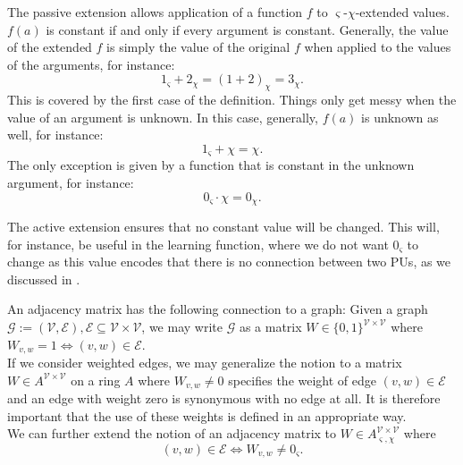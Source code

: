 \documentclass[a4paper,11pt]{report}
\newcommand{\const}{\varsigma} %
\newcommand{\var}{\chi} %
\begin{document}
\begin{Par}
The passive extension allows application of a function $f$ to $\const$-$\var$-extended values. $f(a)$ is constant if and only if every argument is constant. Generally, the value of the extended $f$ is simply the value of the original $f$ when applied to the values of the arguments, for instance:
\[
1_{\const}+2_{\var}=(1+2)_{\var}=3_{\var}.
\]
This is covered by the first case of the definition. Things only get messy when the value of an argument is unknown. In this case, generally, $f(a)$ is unknown as well, for instance:
\[
1_{\const}+\chi=\chi.
\]
The only exception is given by a function that is constant in the unknown argument, for instance:
\[
0_{\const}\cdot\chi =0_{\var}.
\]
\end{Par}

\begin{Par}
The active extension ensures that no constant value will be changed. This will, for instance, be useful in the learning function, where we do not want $0_{\const}$ to change as this value encodes that there is no connection between two PUs, as we discussed in .
\end{Par}

\begin{Par}\label{par:adjacency}
An adjacency matrix has the following connection to a graph: Given a graph $\mathcal{G}:=(\mathcal{V},\mathcal{E}),\mathcal{E}\subseteq\mathcal{V}\times\mathcal{V}$, we may write $\mathcal{G}$ as a matrix $W\in\{0,1\}^{\mathcal{V}\times\mathcal{V}}$ where $W_{v,w}=1\Leftrightarrow (v,w)\in\mathcal{E}$.\\
If we consider weighted edges, we may generalize the notion to a matrix $W\in A^{\mathcal{V}\times\mathcal{V}}$ on a ring $A$ where $W_{v,w}\ne 0$ specifies the weight of edge $(v,w)\in\mathcal{E}$ and an edge with weight zero is synonymous with no edge at all. It is therefore important that the use of these weights is defined in an appropriate way.\\
We can further extend the notion of an adjacency matrix to $W\in A^{\mathcal{V}\times\mathcal{V}}_{\const,\var}$ where
\begin{equation}\label{eq:matrix-graph}
(v,w)\in\mathcal{E}\Leftrightarrow W_{v,w}\ne 0_{\const}.
\end{equation}
\end{Par}
\end{document}
